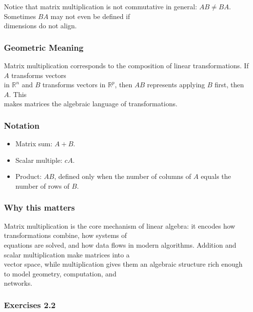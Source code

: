 \documentclass[
  12pt,
  a4paper,
]{article}
\begin{document}
Notice that matrix multiplication is not commutative in general:
\(AB \neq BA\). Sometimes \(BA\) may not even be defined if\\
dimensions do not align.

\subsubsection{Geometric Meaning}\label{geometric-meaning}

Matrix multiplication corresponds to the composition of linear
transformations. If \(A\) transforms vectors\\
in \(\mathbb{R}^n\) and \(B\) transforms vectors in \(\mathbb{R}^p\),
then \(AB\) represents applying \(B\) first, then \(A\). This\\
makes matrices the algebraic language of transformations.

\subsubsection{Notation}\label{notation-5}

\begin{itemize}
\item
  Matrix sum: \(A+B\).
\item
  Scalar multiple: \(cA\).
\item
  Product: \(AB\), defined only when the number of columns of \(A\)
  equals the number of rows of \(B\).
\end{itemize}

\subsubsection{Why this matters}\label{why-this-matters-5}

Matrix multiplication is the core mechanism of linear algebra: it
encodes how transformations combine, how systems of\\
equations are solved, and how data flows in modern algorithms. Addition
and scalar multiplication make matrices into a\\
vector space, while multiplication gives them an algebraic structure
rich enough to model geometry, computation, and\\
networks.

\subsubsection{Exercises 2.2}\label{exercises-22}
\end{document}
